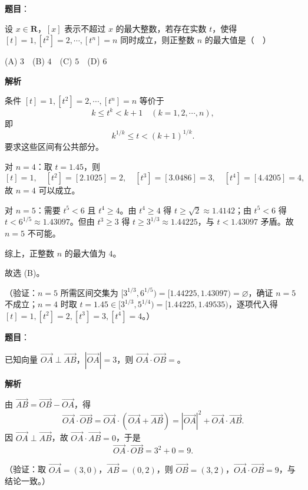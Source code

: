 \begin{answer}

\textbf{题目}：

设 \(x\in\mathbf{R}\)，\([x]\) 表示不超过 \(x\) 的最大整数，若存在实数 \(t\)，使得 \([t]=1,[t^2]=2,\cdots,[t^n]=n\) 同时成立，则正整数 \(n\) 的最大值是（　）

(A) \(3\)　(B) \(4\)　(C) \(5\)　(D) \(6\)

\textbf{解析}

条件 \([t]=1,[t^2]=2,\cdots,[t^n]=n\) 等价于
\nopagebreak[4]
\[
k\leqslant t^k<k+1\quad(k=1,2,\cdots,n),
\]
即
\nopagebreak[4]
\[
k^{1/k}\leqslant t<(k+1)^{1/k}.
\]
要求这些区间有公共部分。

对 \(n=4\)：取 \(t=1.45\)，则
\nopagebreak[4]
\[
[t]=1,\quad [t^2]=[2.1025]=2,\quad [t^3]=[3.0486]=3,\quad [t^4]=[4.4205]=4,
\]
故 \(n=4\) 可以成立。

对 \(n=5\)：需要 \(t^5<6\) 且 \(t^4\geqslant4\)。由 \(t^4\geqslant4\) 得 \(t\geqslant\sqrt2\approx1.4142\)；由 \(t^5<6\) 得 \(t<6^{1/5}\approx1.43097\)。但由 \(t^3\geqslant3\) 得 \(t\geqslant3^{1/3}\approx1.44225\)，与 \(t<1.43097\) 矛盾。故 \(n=5\) 不可能。

综上，正整数 \(n\) 的最大值为 \(4\)。

故选 (B)。

（验证：\(n=5\) 所需区间交集为 \([3^{1/3},6^{1/5})=[1.44225,1.43097)=\varnothing\)，确证 \(n=5\) 不成立；\(n=4\) 时取 \(t=1.45\in[3^{1/3},5^{1/4})=[1.44225,1.49535)\)，逐项代入得 \([t]=1,[t^2]=2,[t^3]=3,[t^4]=4\)。）


\end{answer}
\begin{answer}

\textbf{题目}：

已知向量 \(\overrightarrow{OA}\perp\overrightarrow{AB}\)，\(|\overrightarrow{OA}|=3\)，则 \(\overrightarrow{OA}\cdot\overrightarrow{OB}=\)\gkblank{}。

\textbf{解析}

由 \(\overrightarrow{AB}=\overrightarrow{OB}-\overrightarrow{OA}\)，得
\nopagebreak[4]
\[
\overrightarrow{OA}\cdot\overrightarrow{OB}
=\overrightarrow{OA}\cdot(\overrightarrow{OA}+\overrightarrow{AB})
=|\overrightarrow{OA}|^2+\overrightarrow{OA}\cdot\overrightarrow{AB}.
\]
因 \(\overrightarrow{OA}\perp\overrightarrow{AB}\)，故 \(\overrightarrow{OA}\cdot\overrightarrow{AB}=0\)，于是
\nopagebreak[4]
\[
\overrightarrow{OA}\cdot\overrightarrow{OB}=3^2+0=9.
\]

（验证：取 \(\overrightarrow{OA}=(3,0)\)，\(\overrightarrow{AB}=(0,2)\)，则 \(\overrightarrow{OB}=(3,2)\)，\(\overrightarrow{OA}\cdot\overrightarrow{OB}=9\)，与结论一致。）


\end{answer}
